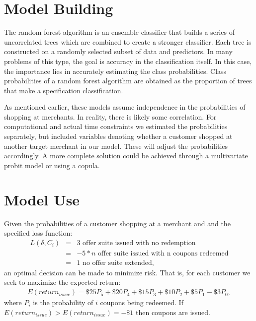 \documentclass[12pt]{article} %
\begin{document}
\section{Model Building}
The random forest algorithm is an ensemble classifier that builds a series of uncorrelated trees which are combined to create a stronger classifier.  Each tree is constructed on a randomly selected subset of data and predictors.  In many problems of this type, the goal is accuracy in the classification itself.  In this case, the importance lies in accurately estimating the class probabilities.  Class probabilities of a random forest algorithm are obtained as the proportion of trees that make a specification classification.

As mentioned earlier, these models assume independence in the probabilities of shopping at merchants.  In reality, there is likely some correlation.  For computational and actual time constraints we estimated the probabilities separately, but included variables denoting whether a customer shopped at another target merchant in our model.  These will adjust the probabilities accordingly.  A more complete solution could be achieved through a multivariate probit model or using a copula.
 
\section{Model Use}
Given the probabilities of a customer shopping at a merchant and and the specified loss function:  
\begin{eqnarray*}
L(\delta,C_i) &=& 3 \text {  offer suite issued with no redemption}\\
&=& -5 * n \text{  offer suite issued with n coupons redeemed}\\
&=& 1 \text{  no offer suite extended},
\end{eqnarray*}
an optimal decision can be made to minimize risk.  That is, for each customer we seek to maximize the expected return:
\begin{eqnarray}
E(return_{issue}) = \$25 P_5 + \$20 P_4 + \$15 P_3 +\$10 P_2 +\$5 P_1 - \$3 P_0,
\end{eqnarray}
where $P_i$ is the probability of $i$ coupons being redeemed.  If $E(return_{issue}) > E(return_{issue}) =-\$1$ then coupons are issued.
\end{document}
